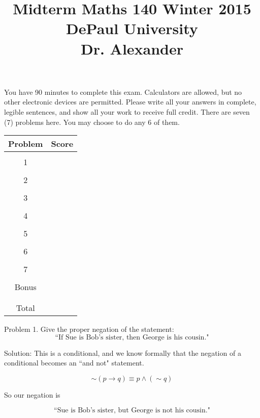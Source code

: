 \documentclass[16 pt]{amsart}
\theoremstyle{definition}
\theoremstyle{remark}
\numberwithin{equation}{subsection}
\begin{document}
\title{Midterm Maths 140 Winter 2015 \\ DePaul University\\Dr. Alexander}
\maketitle
You have 90 minutes to complete this exam.  Calculators are allowed, but no other electronic devices are permitted.  Please write all your answers in complete, legible sentences, and show all your work to receive full credit.  There are seven (7) problems here.  You may choose to do any 6 of them.  
\vspace{1in}


\begin{center}
  \begin{tabular}{ c | c }
    Problem & Score\\
    \hline
    &\\
    1&\\
    &\\
    2&\\
    &\\
    3&\\
    &\\
    4&\\
    &\\
    5&\\
    &\\
    6&\\
    &\\
    7&\\
    &\\
    Bonus&\\
    &\\
    \hline 
    &\\    
    Total& 
 \end{tabular}
\end{center}

\newpage 
Problem 1. Give the proper negation of the statement:
\[
\text{``If Sue is Bob's sister, then George is his cousin."}
\]

\vspace{1in}


Solution:  This is a conditional, and we know formally that the negation of a conditional becomes an ``and not" statement.

\[
\sim(p\rightarrow q)\equiv p\wedge (\sim q)
\]

So our negation is

\[
\text{``Sue is Bob's sister, but George is not his cousin."}
\]
\end{document}
